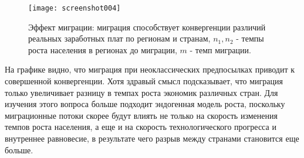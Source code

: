 \documentclass[12pt,a4paper, oneside]{extreport}
\begin{document}
\begin{figure}[h!]
	\centering
	\texttt{[image: screenshot004]}
	\caption[Эффект миграции в неоклассическоц модели роста]{Эффект миграции: миграция  способствует  конвергенции  различий реальных заработных плат по регионам и странам, $n_1, n_2 $ - темпы роста населения в регионах до миграции,  $m $ - темп миграции. }   
	\label{fig:screenshot004}
\end{figure}



На графике видно, что миграция при неоклассических предпосылках приводит к  совершенной конвергенции.
Хотя здравый смысл подсказывает, что миграция только увеличивает разницу в темпах роста экономик различных стран. Для изучения этого вопроса больше подходит эндогенная модель роста, 
поскольку  миграционные потоки скорее будут влиять не только на скорость изменения темпов роста населения, а еще и на скорость  технологического прогресса  и внутреннее равновесие, в результате чего разрыв между странами становится еще больше.






\end{document}
